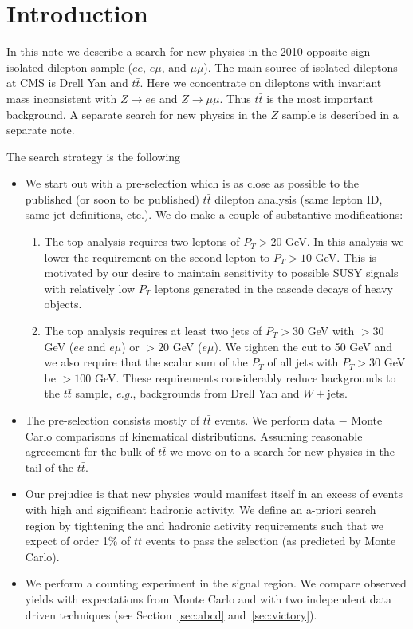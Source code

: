 \section{Introduction}
\label{sec:intro}

In this note we describe a search for new physics in the 2010 
opposite sign isolated dilepton sample ($ee$, $e\mu$, and $\mu\mu$).  
The main source of 
isolated dileptons at CMS is Drell Yan and $t\bar{t}$.
Here we concentrate on dileptons with invariant mass inconsistent
with $Z \to ee$ and $Z \to \mu\mu$.  Thus $t\bar{t}$ is the most
important background.  A separate search for new physics in the $Z$ 
sample is described in a separate note\cite{ref:Ztemplates}.
 
The search strategy is the following

\begin{itemize}

\item We start out with a pre-selection which is as close as 
possible to the published (or soon to be published) $t\bar{t}$
dilepton analysis\cite{ref:top} (same lepton ID, same jet definitions,
etc.).  We do make a couple of substantive modifications:

\begin{enumerate}
\item The top analysis requires two leptons of $P_T > 20$ GeV.  
 In this
analysis we lower the requirement on the second lepton to $P_T > 10$ 
GeV.  This is motivated by our desire to maintain sensitivity to possible
SUSY signals with relatively low $P_T$ leptons generated in the 
cascade decays of heavy objects.
\item The top analysis requires at least two jets of $P_T > 30$
GeV with \met $>30$ GeV ($ee$ and $e\mu$) or \met $>20$ GeV ($e \mu$).
We tighten the \met cut to 50 GeV and we 
also require that the scalar sum of the $P_T$ of all jets with $P_T > 30$
GeV be $> 100$ GeV.  These requirements considerably
reduce backgrounds to the $t\bar{t}$ sample, {\em e.g.}, backgrounds
from Drell Yan and $W+$jets.
\end{enumerate}

\item The pre-selection consists mostly of $t\bar{t}$ events.  We perform 
data $-$ Monte Carlo comparisons of kinematical distributions.  Assuming
reasonable agreeement for the bulk of $t\bar{t}$ we move on to a 
search for new physics in the tail of the $t\bar{t}$.

\item Our prejudice is that new physics would manifest itself in an
excess of events with high \met and significant hadronic activity.
We define an a-priori search region by tightening the \met and 
hadronic activity requirements such that we expect of order 1\% 
of $t\bar{t}$ events to pass the selection (as predicted by Monte Carlo).

\item We perform a counting experiment in the signal region.  We compare
observed yields with expectations from Monte Carlo and with two independent
data driven techniques (see Section~\ref{sec:abcd} and~\ref{sec:victory}).

\end{itemize}


